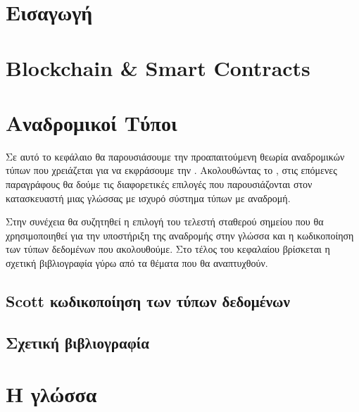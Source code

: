 \documentclass[diploma]{softlab-thesis}
\begin{document}

\tableofcontents
\listoftables
\listoffigures



\mainmatter

\chapter{Εισαγωγή}
\label{chap:chapter1}





\chapter{Blockchain \& Smart Contracts}
\label{chap:chapter2}






\chapter{Αναδρομικοί Τύποι}
\label{chap:chapter3}


Σε αυτό το κεφάλαιο θα παρουσιάσουμε την προαπαιτούμενη θεωρία αναδρομικών
τύπων που χρειάζεται για να εκφράσουμε την \FOMF. Ακολουθώντας το \cite{tapl}, στις
επόμενες παραγράφους θα δούμε τις διαφορετικές επιλογές που παρουσιάζονται στον
κατασκευαστή μιας γλώσσας με ισχυρό σύστημα τύπων με αναδρομή.

Στην συνέχεια θα συζητηθεί η επιλογή του τελεστή σταθερού σημείου που θα χρησιμοποιηθεί
για την υποστήριξη της αναδρομής στην γλώσσα και η κωδικοποίηση των τύπων δεδομένων
που ακολουθούμε. Στο τέλος του κεφαλαίου βρίσκεται η σχετική βιβλιογραφία γύρω από τα
θέματα που θα αναπτυχθούν.





\section{Scott κωδικοποίηση των τύπων δεδομένων}
\label{sec:data-encoding}



\section{Σχετική βιβλιογραφία}



\chapter{Η γλώσσα \FIR{}}
\label{chap:chapter4}
\end{document}
